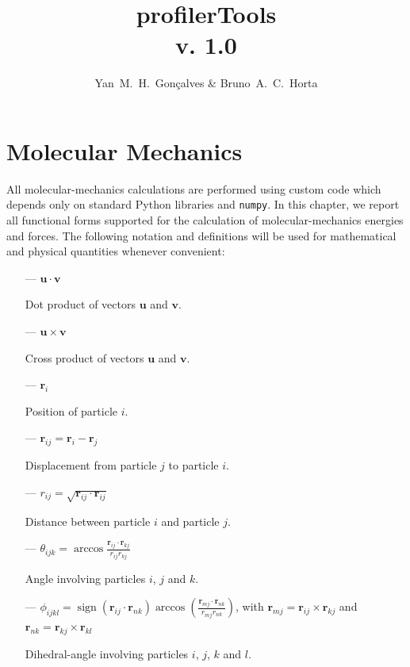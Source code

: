 \documentclass[10pt,a4paper]{report}
\title{profilerTools \\ v. 1.0}
\author{Yan~M.~H.~Gon\c{c}alves \& Bruno~A.~C.~Horta}
\numberwithin{equation}{section}
\DeclareMathOperator{\sign}{sign}
\newcommand{\rsub}[1]{\mathbf{r}_{#1}}
\begin{document}
  \maketitle

\tableofcontents

\newcommand*{\profi}{\texttt{profilerOpt}}

\chapter{Molecular Mechanics}
\label{chap:mm}

All molecular-mechanics calculations are performed using custom code which depends only on standard Python libraries and \texttt{numpy}.
In this chapter, we report all functional forms supported for the
calculation of molecular-mechanics energies and forces.
The following notation and definitions will be used for mathematical and physical quantities whenever convenient:

\begin{itemize}
\item[---] $\mathbf{u} \cdot \mathbf{v}$ \par \hspace{10ex} Dot product of vectors $\mathbf{u}$ and $\mathbf{v}$.
\item[---] $\mathbf{u} \times \mathbf{v}$ \par \hspace{10ex} Cross product of vectors $\mathbf{u}$ and $\mathbf{v}$.
\item[---] $\mathbf{r}_i$ \par \hspace{10ex} Position of particle $i$.
\item[---] $\mathbf{r}_{ij} = \mathbf{r}_i - \mathbf{r}_j$ \par \hspace{10ex} Displacement from particle $j$ to particle $i$.
\item[---] $r_{ij} = \sqrt{\mathbf{r}_{ij} \cdot \mathbf{r}_{ij}}$ \par \hspace{10ex} Distance between particle $i$ and particle $j$.
\item [---] $\theta_{ijk} = \arccos{\frac{\mathbf{r}_{ij} \cdot \mathbf{r}_{kj}}{r_{ij}r_{kj}}}$  \par \hspace{10ex} Angle involving particles $i$, $j$ and $k$.
  \item [---] $\phi_{ijkl} = \sign{(\rsub{ij} \cdot \rsub{nk})} \arccos{\left( \frac{\rsub{mj} \cdot \rsub{nk}}{r_{mj}r_{nk}} \right)}$, with $\rsub{mj} = \rsub{ij}\times\rsub{kj}$ and $\rsub{nk} = \rsub{kj}\times\rsub{kl}$
     \par \hspace{10ex} Dihedral-angle involving particles $i$, $j$, $k$ and $l$.
   \end{itemize}
\end{document}
